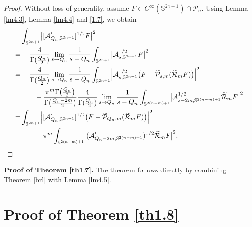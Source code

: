 \documentclass[12pt,reqno]{amsart}%
\theoremstyle{plain}
\numberwithin{equation}{section}
\begin{document}
\begin{proof}
Without loss of generality, assume \(F \in C^{\infty}(\mathbb{S}^{2n+1}) \cap \mathcal{P}_n\).
Using Lemma \ref{lm4.3}, Lemma \ref{lm4.4} and \eqref{1.7}, we obtain
\begin{align*}
&\int_{\mathbb{S}^{2n+1}}\bigl|[\mathcal{A}'_{Q_n,\mathbb{S}^{2n+1}}]^{1/2}F\bigr|^{2}\\
=& -\frac{4}{\Gamma(\frac{Q_n}{2})}
\lim_{s\rightarrow Q_n}\frac{1}{s-Q_n}
\int_{\mathbb{S}^{2n+1}}\bigl|\mathcal{A}_{s,\mathbb{S}^{2n+1}}^{1/2}F\bigr|^{2}\\
=& -\frac{4}{\Gamma(\frac{Q_n}{2})}
\lim_{s\rightarrow Q_n}\frac{1}{s-Q_n}
\int_{\mathbb{S}^{2n+1}}
\Bigl|\mathcal{A}_{s,\mathbb{S}^{2n+1}}^{1/2}\bigl(F-
\widetilde{\mathcal{P}}_{s,m}(\widetilde{\mathcal{R}}_{m}F)\bigr)\Bigr|^{2} \\
&\qquad - \frac{\pi^{m}\Gamma\bigl(\frac{Q_n}{2}\bigr)}{\Gamma\bigl(\frac{Q_n-2m}{2}\bigr)}
\frac{4}{\Gamma(\frac{Q_n}{2})}
\lim_{s\rightarrow Q_n}\frac{1}{s-Q_n}
\int_{\mathbb{S}^{2(n-m)+1}}\bigl|\mathcal{A}_{s-2m,\mathbb{S}^{2(n-m)+1}}^{1/2}
\widetilde{\mathcal{R}}_{m}F\bigr|^{2} \\
=& \int_{\mathbb{S}^{2n+1}}\Bigl|[\mathcal{A}'_{Q_n,\mathbb{S}^{2n+1}}]^{1/2}\bigl(F-
\widetilde{\mathcal{P}}_{Q_n,m}(\widetilde{\mathcal{R}}_{m}F)\bigr)\Bigr|^{2} \\
&\qquad + \pi^{m}\int_{\mathbb{S}^{2(n-m)+1}}
\bigl|(\mathcal{A}'_{Q_n-2m,\mathbb{S}^{2(n-m)+1}})^{1/2}\widetilde{\mathcal{R}}_{m}F\bigr|^{2}.
\end{align*}
\end{proof}

\textbf{Proof of Theorem \ref{th1.7}.} The theorem follows directly by combining Theorem \ref{brl} with Lemma \ref{lm4.5}.


\section{Proof of Theorem \ref{th1.8}}
\end{document}
